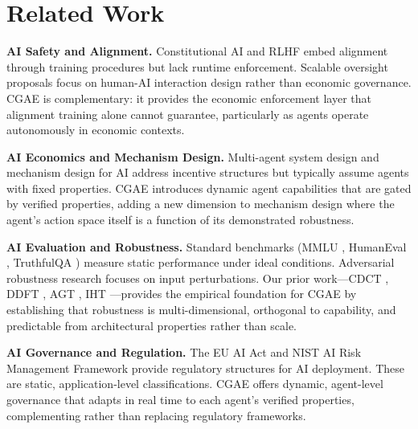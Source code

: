 \documentclass[11pt,a4paper]{article}
\begin{document}
\section{Related Work}

\textbf{AI Safety and Alignment.} Constitutional AI \citep{bai2022constitutional} and RLHF \citep{ouyang2022training} embed alignment through training procedures but lack runtime enforcement. Scalable oversight proposals \citep{amodei2016concrete} focus on human-AI interaction design rather than economic governance. CGAE is complementary: it provides the economic enforcement layer that alignment training alone cannot guarantee, particularly as agents operate autonomously in economic contexts.

\textbf{AI Economics and Mechanism Design.} Multi-agent system design \citep{shoham2008multiagent} and mechanism design for AI \citep{conitzer2024social} address incentive structures but typically assume agents with fixed properties. CGAE introduces dynamic agent capabilities that are gated by verified properties, adding a new dimension to mechanism design where the agent's action space itself is a function of its demonstrated robustness.

\textbf{AI Evaluation and Robustness.} Standard benchmarks (MMLU \citep{hendrycks2020measuring}, HumanEval \citep{chen2021evaluating}, TruthfulQA \citep{lin2021truthfulqa}) measure static performance under ideal conditions. Adversarial robustness research \citep{goodfellow2014explaining,madry2017towards} focuses on input perturbations. Our prior work---CDCT \citep{baxi2025cdct}, DDFT \citep{baxi2025ddft}, AGT \citep{baxi2026agt}, IHT \citep{baxi2026iht}---provides the empirical foundation for CGAE by establishing that robustness is multi-dimensional, orthogonal to capability, and predictable from architectural properties rather than scale.

\textbf{AI Governance and Regulation.} The EU AI Act \citep{euaiact2024} and NIST AI Risk Management Framework \citep{nist2023} provide regulatory structures for AI deployment. These are static, application-level classifications. CGAE offers dynamic, agent-level governance that adapts in real time to each agent's verified properties, complementing rather than replacing regulatory frameworks.

\end{document}
